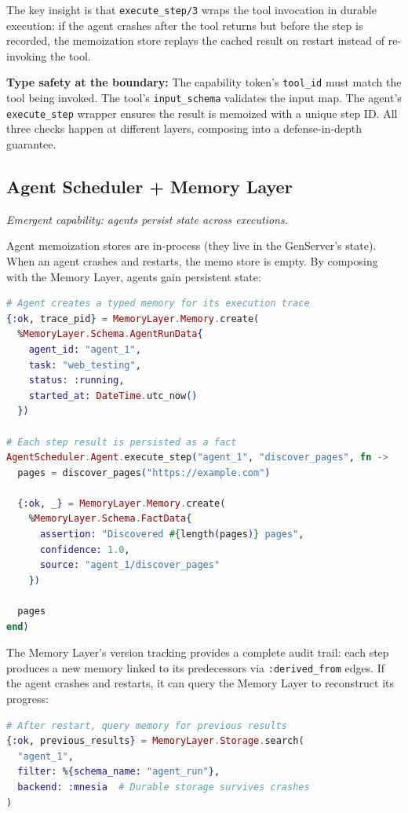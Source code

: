 \documentclass[12pt,a4paper]{article}
\theoremstyle{definition}
\begin{document}
The key insight is that \texttt{execute\_step/3} wraps the tool invocation
in durable execution: if the agent crashes after the tool returns but before
the step is recorded, the memoization store replays the cached result on restart
instead of re-invoking the tool.

\textbf{Type safety at the boundary:}
The capability token's \texttt{tool\_id} must match the tool being invoked.
The tool's \texttt{input\_schema} validates the input map. The agent's
\texttt{execute\_step} wrapper ensures the result is memoized with a unique
step ID. All three checks happen at different layers, composing into a
defense-in-depth guarantee.

\subsection{Agent Scheduler + Memory Layer}\label{subsec:agent-memory}

\emph{Emergent capability: agents persist state across executions.}

Agent memoization stores are in-process (they live in the GenServer's state).
When an agent crashes and restarts, the memo store is empty. By composing with
the Memory Layer, agents gain persistent state:

\begin{lstlisting}[language=elixir, caption={Agent persisting state to typed memory}]
# Agent creates a typed memory for its execution trace
{:ok, trace_pid} = MemoryLayer.Memory.create(
  %MemoryLayer.Schema.AgentRunData{
    agent_id: "agent_1",
    task: "web_testing",
    status: :running,
    started_at: DateTime.utc_now()
  })

# Each step result is persisted as a fact
AgentScheduler.Agent.execute_step("agent_1", "discover_pages", fn ->
  pages = discover_pages("https://example.com")

  {:ok, _} = MemoryLayer.Memory.create(
    %MemoryLayer.Schema.FactData{
      assertion: "Discovered #{length(pages)} pages",
      confidence: 1.0,
      source: "agent_1/discover_pages"
    })

  pages
end)
\end{lstlisting}

The Memory Layer's version tracking provides a complete audit trail: each
step produces a new memory linked to its predecessors via \texttt{:derived\_from}
edges. If the agent crashes and restarts, it can query the Memory Layer
to reconstruct its progress:

\begin{lstlisting}[language=elixir, caption={Agent recovering state from memory after crash}]
# After restart, query memory for previous results
{:ok, previous_results} = MemoryLayer.Storage.search(
  "agent_1",
  filter: %{schema_name: "agent_run"},
  backend: :mnesia  # Durable storage survives crashes
)
\end{lstlisting}
\end{document}
